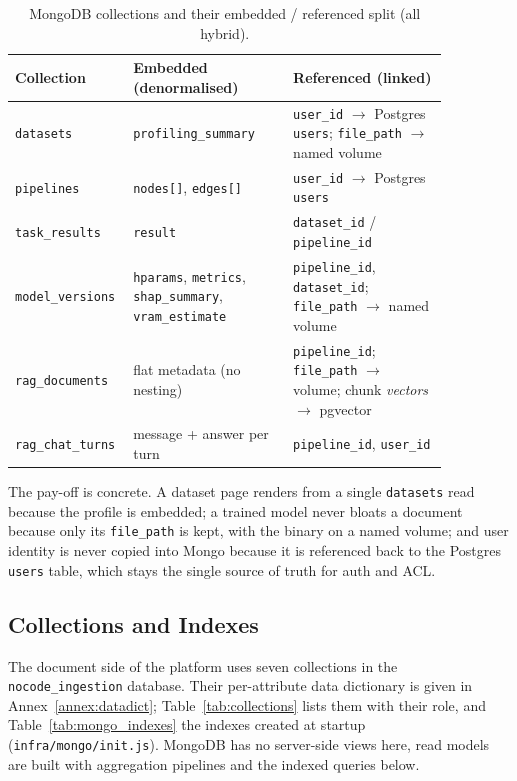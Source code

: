 \documentclass[12pt, a4paper, oneside]{report}
\begin{document}
\begin{table}[H]
\centering
\caption{MongoDB collections and their embedded / referenced split (all hybrid).}
\label{tab:mongo_modelling}
\begin{tabular}{|p{0.17\linewidth}|L{0.35\linewidth}|L{0.34\linewidth}|}
\hline
\textbf{Collection} & \textbf{Embedded (denormalised)} & \textbf{Referenced (linked)} \\
\hline
\texttt{datasets} & \texttt{profiling\_summary} & \texttt{user\_id} $\to$ Postgres \texttt{users}; \texttt{file\_path} $\to$ named volume \\ \hline
\texttt{pipelines} & \texttt{nodes[]}, \texttt{edges[]} & \texttt{user\_id} $\to$ Postgres \texttt{users} \\ \hline
\texttt{task\_results} & \texttt{result} & \texttt{dataset\_id} / \texttt{pipeline\_id} \\ \hline
\texttt{model\_versions} & \texttt{hparams}, \texttt{metrics}, \texttt{shap\_summary}, \texttt{vram\_estimate} & \texttt{pipeline\_id}, \texttt{dataset\_id}; \texttt{file\_path} $\to$ named volume \\ \hline
\texttt{rag\_documents} & flat metadata (no nesting) & \texttt{pipeline\_id}; \texttt{file\_path} $\to$ volume; chunk \emph{vectors} $\to$ pgvector \\ \hline
\texttt{rag\_chat\_turns} & message + answer per turn & \texttt{pipeline\_id}, \texttt{user\_id} \\
\hline
\end{tabular}
\end{table}

The pay-off is concrete. A dataset page renders from a single
\texttt{datasets} read because the profile is embedded; a trained model
never bloats a document because only its \texttt{file\_path} is kept,
with the binary on a named volume; and user identity is never copied
into Mongo because it is referenced back to the Postgres \texttt{users}
table, which stays the single source of truth for auth and ACL.

\subsection{Collections and Indexes}

The document side of the platform uses seven collections in the
\texttt{nocode\_ingestion} database. Their per-attribute data dictionary
is given in Annex~\ref{annex:datadict}; Table~\ref{tab:collections}
lists them with their role, and Table~\ref{tab:mongo_indexes} the
indexes created at startup (\texttt{infra/mongo/init.js}). MongoDB has
no server-side views here, read models are built with aggregation
pipelines and the indexed queries below.
\end{document}

